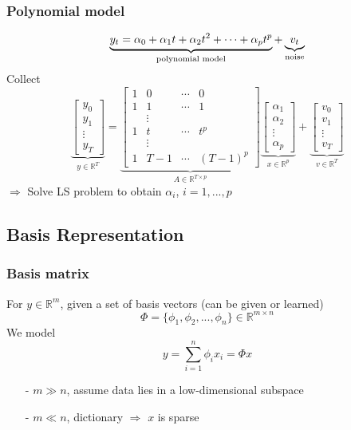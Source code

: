 \begin{multicols}{2}
\subsubsection{Polynomial model}
\[
    \underbrace{y_t = \alpha_0 + \alpha_1t + \alpha_2t^2 +\cdots +\alpha_pt^p}_{\text{\rm polynomial model}} + \underbrace{v_t}_{\text{\rm noise}}
\]
Collect
\[
    \underbrace{
    \left[\begin{array}{l}
        y_0 \\
        y_1 \\
        \vdots \\
        y_T
    \end{array}
    \right]}_{y\in\mathbb{R}^T}
    =
    \underbrace{
    \left[\begin{array}{cccc}
        1 & 0  & \cdots & 0 \\
        1 & 1  & \cdots & 1 \\
          &   \vdots &   &   \\
        1 & t  & \cdots & t^p \\
          &    \vdots &   &   \\
        1 & T-1  & \cdots & (T-1)^p
    \end{array}
    \right]}_{A\in\mathbb{R}^{T\times p}}
    \underbrace{
    \left[\begin{array}{l}
        \alpha_1 \\
        \alpha_2 \\
        \vdots \\
        \alpha_p
    \end{array}
    \right]}_{x\in\mathbb{R}^p}
    +
    \underbrace{
    \left[\begin{array}{l}
        v_0 \\
        v_1 \\
        \vdots \\
        v_T
    \end{array}
    \right]}_{v\in \mathbb{R}^T}
\]
$\Longrightarrow$ Solve LS problem to obtain $\alpha_i$, $i=1,...,p$
\subsection{Basis Representation}
\subsubsection{Basis matrix}
For $y\in\mathbb{R}^m$, given a set of basis vectors (can be given or learned)
\[
    \Phi =\{\phi _1,\phi _2,...,\phi _n\}\in\mathbb{R}^{m\times n}
\]
We model 
\[
    y=\sum_{i=1}^n\phi_ix_i = \Phi x
\]
\begin{enumerate}
    \item [-] $m\gg n$, assume data lies in a low-dimensional subspace 
    \item [-] $m\ll n$, dictionary $\Longrightarrow$ $x$ is sparse
\end{enumerate}

\end{multicols}
